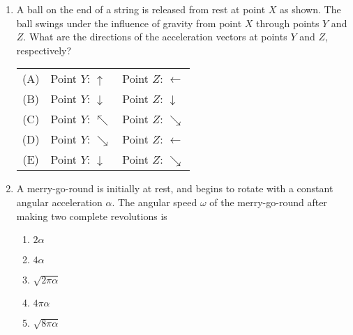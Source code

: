 \documentclass{../../../oss-apphys}
\begin{document}
\begin{multicols*}{2}
  \begin{enumerate}[leftmargin=18pt,resume]
  \item A ball on the end of a string is released from rest at point $X$ as
    shown. The ball swings under the influence of gravity from point $X$ through
    points $Y$ and $Z$. What are the directions of the acceleration vectors at
    points $Y$ and $Z$, respectively?
    \begin{tabular}{cll}
      (A) & Point $Y$: {\LARGE $\uparrow$} & Point $Z$: {\LARGE $\leftarrow$}\\
      (B) & Point $Y$: {\LARGE $\downarrow$}& Point $Z$: {\LARGE $\downarrow$}\\
      (C) & Point $Y$: {\LARGE $\nwarrow$} & Point $Z$: {\LARGE $\searrow$}\\
      (D) & Point $Y$: {\LARGE $\searrow$} & Point $Z$: {\LARGE $\leftarrow$}\\
      (E) & Point $Y$: {\LARGE $\downarrow$} & Point $Z$: {\LARGE $\searrow$}\\
    \end{tabular}
    
  \item A merry-go-round is initially at rest, and begins to rotate with a
    constant angular acceleration $\alpha$. The angular speed $\omega$ of the
    merry-go-round after making two complete revolutions is
    \begin{enumerate}[nosep,leftmargin=18pt,label=(\Alph*)]
    \item $2\alpha$
    \item $4\alpha$
    \item $\sqrt{2\pi\alpha}$
    \item $4\pi\alpha$
    \item $\sqrt{8\pi\alpha}$
    \end{enumerate}
  \end{enumerate}


\end{multicols*}
\end{document}
